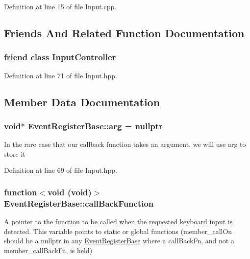 Definition at line 15 of file Input.\-cpp.



\subsection{Friends And Related Function Documentation}
\hypertarget{class_event_register_base_a083d5a8d8c2dd3a28d1f55d2965db0ab}{
\subsubsection[{Input\-Controller}]{\setlength{\rightskip}{0pt plus 5cm}friend class {\bf Input\-Controller}\hspace{0.3cm}{\ttfamily [friend]}}}\label{class_event_register_base_a083d5a8d8c2dd3a28d1f55d2965db0ab}


Definition at line 71 of file Input.\-hpp.



\subsection{Member Data Documentation}
\hypertarget{class_event_register_base_ad28e4551bc4710d3a79ff5d5f3f50543}{
\subsubsection[{arg}]{\setlength{\rightskip}{0pt plus 5cm}void$\ast$ Event\-Register\-Base\-::arg = nullptr\hspace{0.3cm}{\ttfamily [protected]}}}\label{class_event_register_base_ad28e4551bc4710d3a79ff5d5f3f50543}
In the rare case that our callback function takes an argument, we will use arg to store it 

Definition at line 69 of file Input.\-hpp.

\hypertarget{class_event_register_base_a8fcbaadc872f483e42426960e159d4b4}{
\subsubsection[{call\-Back\-Function}]{\setlength{\rightskip}{0pt plus 5cm}function$<$void (void)$>$ Event\-Register\-Base\-::call\-Back\-Function\hspace{0.3cm}{\ttfamily [protected]}}}\label{class_event_register_base_a8fcbaadc872f483e42426960e159d4b4}
A pointer to the function to be called when the requested keyboard input is detected. This variable points to static or global functions (member\-\_\-call\-On should be a nullptr in any \hyperlink{class_event_register_base}{Event\-Register\-Base} where a call\-Back\-Fn, and not a member\-\_\-call\-Back\-Fn, is held) 

